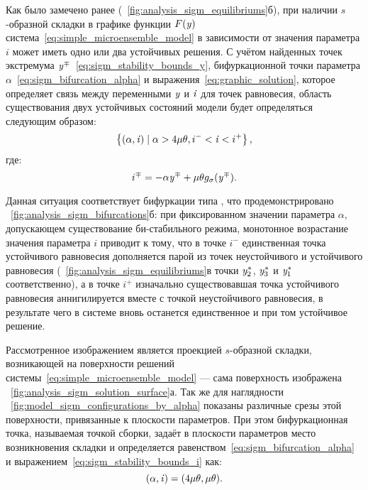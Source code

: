 Как было замечено ранее (\seefigure~\ref{fig:analysis_sigm_equilibriums}б), при наличии $s$-образной складки в графике функции $F(\mathit{y})$ система~\eqref{eq:simple_microensemble_model} в зависимости от значения параметра $i$ может иметь одно или два устойчивых решения. С учётом найденных точек экстремума $\mathit{y}^{\mp}$~\eqref{eq:sigm_stability_bounds_y}, бифуркационной точки параметра $\alpha$~\eqref{eq:sigm_bifurcation_alpha} и выражения~\eqref{eq:graphic_solution}, которое определяет связь между переменными $\mathit{y}$ и $\mathit{i}$ для точек равновесия, область существования двух устойчивых состояний модели будет определяться следующим образом:
\begin{equation}
    \nonumber
    \left\{(\alpha, \mathit{i}) \mid \alpha > 4 \mu \theta, i^{-} < \mathit{i} < i^{+}\right\},
\end{equation}
где:
\begin{equation}
    \label{eq:sigm_stability_bounds_i}
    i^{\mp} = -\alpha \mathit{y}^{\mp} + \mu \theta g_{\sigma}(\mathit{y}^{\mp}).
\end{equation}

Данная ситуация соответствует бифуркации типа , что продемонстрировано \onfigure~\ref{fig:analysis_sigm_bifurcations}б: при фиксированном значении параметра $\alpha$, допускающем существование би-стабильного режима, монотонное возрастание значения параметра $i$ приводит к тому, что в точке $i^{-}$ единственная точка устойчивого равновесия дополняется парой из точек неустойчивого и устойчивого равновесия (\onfigure~\ref{fig:analysis_sigm_equilibriums}в точки $\mathit{y}^{*}_{2}$, $\mathit{y}^{*}_{3}$ и $\mathit{y}^{*}_{1}$ соответственно), а в точке $i^{+}$ изначально существовавшая точка устойчивого равновесия аннигилируется вместе с точкой неустойчивого равновесия, в результате чего в системе вновь останется единственное и при том устойчивое решение. 

Рассмотренное изображением является проекцией $s$-образной складки, возникающей на поверхности решений системы~\eqref{eq:simple_microensemble_model} --- сама поверхность изображена \onfigure~\ref{fig:analysis_sigm_solution_surface}а. Так же для наглядности \onfigure~\ref{fig:model_sigm_configurations_by_alpha} показаны различные срезы этой поверхности, привязанные к плоскости параметров. При этом бифуркационная точка, называемая точкой сборки, задаёт в плоскости параметров место возникновения складки и определяется равенством~\eqref{eq:sigm_bifurcation_alpha} и выражением~\eqref{eq:sigm_stability_bounds_i} как:
\begin{equation}
    \nonumber
    (\alpha, \mathit{i}) = (4 \mu \theta, \mu \theta).
\end{equation}

